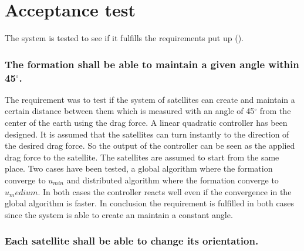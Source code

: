 \chapter{Acceptance test} \label{chap:acceptanceTest}
The system is tested to see if it fulfills the requirements put up ().

\subsection{The formation shall be able to maintain a given angle within 45$^{\circ}$.}
%
The requirement was to test if the system of satellites can create and maintain a certain distance between them which is measured with an angle of 45$^{\circ}$ from the center of the earth using the drag force. A linear quadratic controller has been designed. It is assumed that the satellites can turn instantly to the direction of the desired drag force. So the output of the controller can be seen as the applied drag force to the satellite.        
%
The satellites are assumed to start from the same place. Two cases have been tested, a global algorithm where the formation converge to $u_{min}$ and distributed algorithm where the formation converge to $u_medium$. In both cases the controller reacts well even if the convergence in the global algorithm is faster.
%
In conclusion the requirement is fulfilled in both cases since the system is able to create an maintain a constant angle.  
\subsection{Each satellite shall be able to change its orientation.}
%


